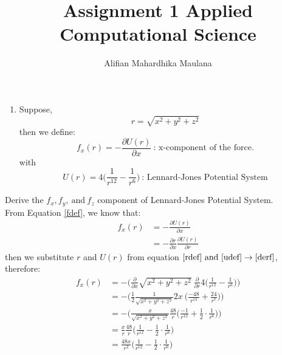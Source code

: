 \documentclass[a4paper,12pt]{article}
\title{Assignment 1 Applied Computational Science}
\author{Alifian Mahardhika Maulana}
\begin{document}
\maketitle
\begin{enumerate}
	\item Suppose,
	\begin{equation}\label{rdef}
	r=\sqrt{x^2+y^2+z^2}
	\end{equation}
	then we define:
	\begin{equation}\label{fdef}
	f_x(r)=-\frac{\partial U(r)}{\partial x}\ \text{: x-component of the force.}
	\end{equation}
	with
	\begin{equation}\label{udef}
	U(r) = 4 \bigg(\frac{1}{r^{12}}-\frac{1}{r^6}\bigg)\ \text{: Lennard-Jones Potential System}
	\end{equation}
\end{enumerate}
Derive the $f_x,f_y,\ \text{and}\ f_z$ component of Lennard-Jones Potential System.\\
\newline
From Equation \eqref{fdef}, we know that:
\begin{equation}\label{derf}
\begin{aligned}
f_x(r) &=-\frac{\partial U(r)}{\partial x}\\
&= -\frac{\partial r}{\partial x}\frac{\partial U(r)}{\partial r}
\end{aligned}
\end{equation}
then we substitute $r$ and $U(r)$ from equation $\eqref{rdef}\ \text{and}\ \eqref{udef} \rightarrow\eqref{derf}$, therefore:
\begin{equation}\label{fxcomp}
\begin{aligned}
f_x(r) &= - \bigg( \frac{\partial}{\partial x} \sqrt{x^2+y^2+z^2}\ \frac{\partial}{\partial r} 4 \bigg(\frac{1}{r^{12}}-\frac{1}{r^6}\bigg) \bigg) \\
&= - \bigg( \frac{1}{2} \frac{1}{\sqrt{x^2+y^2+z^2}}2x\ \bigg( \frac{-48}{r^{13}}+\frac{24}{r^7} \bigg) \bigg)\\
&= - \bigg( \frac{x}{\sqrt{x^2+y^2+z^2}} \frac{48}{r} \bigg( \frac{-1}{r^{12}}+\frac{1}{2} \cdot \frac{1}{r^6} \bigg) \bigg)\\
&=  \frac{x}{r} \frac{48}{r} \bigg( \frac{1}{r^{12}}-\frac{1}{2} \cdot \frac{1}{r^6} \bigg)\\
&=  \frac{48x}{r^2} \bigg( \frac{1}{r^{12}}-\frac{1}{2} \cdot \frac{1}{r^6} \bigg)\\
\end{aligned}
\end{equation}
\end{document}
